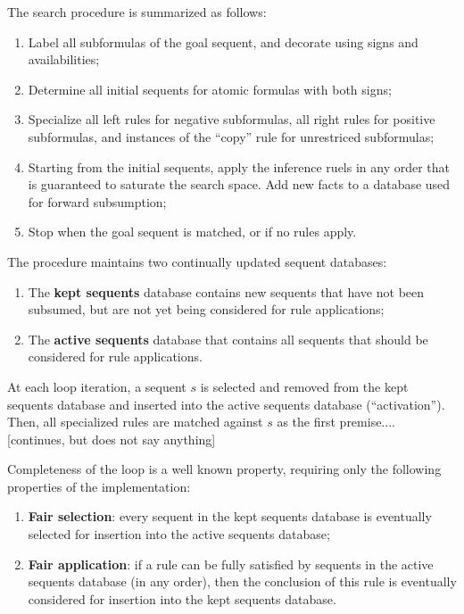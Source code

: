 \documentclass{article}
\theoremstyle{definition}
\newcommand{\strong}[1]{\textbf{#1}}
\begin{document}

The search procedure is summarized as follows:

\begin{enumerate}
\item Label all subformulas of the goal sequent, and decorate using signs and
  availabilities;
\item Determine all initial sequents for atomic formulas with both signs;
\item Specialize all left rules for negative subformulas, all right rules for
  positive subformulas, and instances of the ``copy'' rule for unrestriced
  subformulas;
\item Starting from the initial sequents, apply the inference ruels in any order
  that is guaranteed to saturate the search space. Add new facts to a database
  used for forward subsumption;
\item Stop when the goal sequent is matched, or if no rules apply.
\end{enumerate}

The procedure maintains two continually updated sequent databases:

\begin{enumerate}
\item The \strong{kept sequents} database contains new sequents that have not
  been subsumed, but are not yet being considered for rule applications;
\item The \strong{active sequents} database that contains all sequents that
  should be considered for rule applications.
\end{enumerate}

At each loop iteration, a sequent $s$ is selected and removed from the kept
sequents database and inserted into the active sequents database
(``activation''). Then, all specialized rules are matched against $s$ as the
first premise.... [continues, but does not say anything]

Completeness of the loop is a well known property, requiring only the following
properties of the implementation:

\begin{enumerate}
\item \strong{Fair selection}: every sequent in the kept sequents database is
  eventually selected for insertion into the active sequents database;
\item \strong{Fair application}: if a rule can be fully satisfied by sequents in
  the active sequents database (in any order), then the conclusion of this rule
  is eventually considered for insertion into the kept sequents database.
\end{enumerate}
\end{document}
